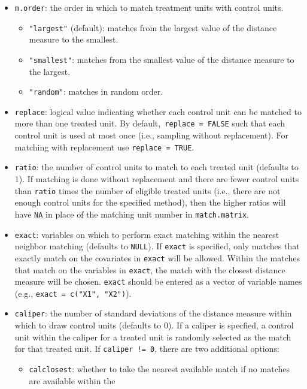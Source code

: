 \begin{itemize}
\item \texttt{m.order}: the order in which to match
  treatment units with control units.
  \begin{itemize}
  \item {\tt "largest"} (default): matches from the largest value of
    the distance measure to the smallest.
  \item {\tt "smallest"}: matches from the smallest value of the
    distance measure to the largest.
  \item {\tt "random"}: matches in random order.
  \end{itemize}
\item \texttt{replace}: logical value indicating whether each control
unit can be matched to more than one treated unit. By default,{\tt
replace = FALSE} such that each
control unit is used at most once (i.e., sampling without
replacement). For
  matching with replacement use \texttt{replace = TRUE}.  
\item \texttt{ratio}: the number of control units to match to each
  treated unit (defaults to 1).  If matching is done without replacement
  and there are fewer control units than {\tt ratio} times the number of
  eligible treated units (i.e., there are not enough control units for
  the specified method), then the higher ratios will have \texttt{NA}
  in place of the matching unit number in \texttt{match.matrix}.
\item \texttt{exact}: variables on which to perform exact matching
  within the nearest neighbor matching (defaults to {\tt NULL}).  If
  \texttt{exact} is specified, only matches that exactly match on the
  covariates in \texttt{exact} will be allowed.  Within the matches
  that match on the variables in \texttt{exact}, the match with the
  closest distance measure will be chosen.  \texttt{exact} should be
  entered as a vector of variable names (e.g., \texttt{exact = c("X1",
    "X2")}).
\item \texttt{caliper}: the number of standard deviations of the
  distance measure within which to draw control units (defaults to 0).  If
  a caliper is specfied, a control unit within the caliper for a treated unit
  is randomly selected as the match for that treated unit.  If
  \texttt{caliper != 0}, there are two additional options:
  \begin{itemize} 
  \item \texttt{calclosest}: whether to take the nearest
    available match if no matches are available within the

\end{itemize}
\end{itemize}
